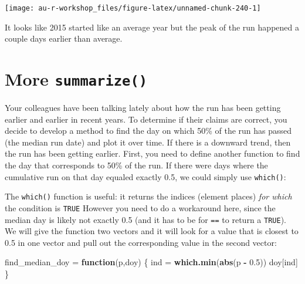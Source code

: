 \documentclass[]{book}
\newenvironment{Shaded}{\begin{snugshade}}{\end{snugshade}}
\newcommand{\KeywordTok}[1]{\textcolor[rgb]{0.13,0.29,0.53}{\textbf{#1}}}
\newcommand{\FloatTok}[1]{\textcolor[rgb]{0.00,0.00,0.81}{#1}}
\newcommand{\StringTok}[1]{\textcolor[rgb]{0.31,0.60,0.02}{#1}}
\newcommand{\ControlFlowTok}[1]{\textcolor[rgb]{0.13,0.29,0.53}{\textbf{#1}}}
\newcommand{\OperatorTok}[1]{\textcolor[rgb]{0.81,0.36,0.00}{\textbf{#1}}}
\newcommand{\NormalTok}[1]{#1}
\theoremstyle{definition}
\theoremstyle{definition}
\theoremstyle{definition}
\theoremstyle{remark}
\begin{document}
\begin{center}\texttt{[image: au-r-workshop\_files/figure-latex/unnamed-chunk-240-1]} \end{center}

It looks like 2015 started like an average year but the peak of the run
happened a couple days earlier than average.

\section{\texorpdfstring{More
\texttt{summarize()}}{More summarize()}}\label{more-summarize}

Your colleagues have been talking lately about how the run has been
getting earlier and earlier in recent years. To determine if their
claims are correct, you decide to develop a method to find the day on
which 50\% of the run has passed (the median run date) and plot it over
time. If there is a downward trend, then the run has been getting
earlier. First, you need to define another function to find the day that
corresponds to 50\% of the run. If there were days where the cumulative
run on that day equaled exactly 0.5, we could simply use
\texttt{which()}:

\begin{Shaded}
\end{Shaded}

The \texttt{which()} function is useful: it returns the indices (element
places) \emph{for which} the condition is \texttt{TRUE} However you need
to do a workaround here, since the median day is likely not exactly 0.5
(and it has to be for \texttt{==} to return a \texttt{TRUE}). We will
give the function two vectors and it will look for a value that is
closest to 0.5 in one vector and pull out the corresponding value in the
second vector:

\begin{Shaded}
\begin{Highlighting}[]
\NormalTok{find_median_doy =}\StringTok{ }\ControlFlowTok{function}\NormalTok{(p,doy) \{}
\NormalTok{  ind =}\StringTok{ }\KeywordTok{which.min}\NormalTok{(}\KeywordTok{abs}\NormalTok{(p }\OperatorTok{-}\StringTok{ }\FloatTok{0.5}\NormalTok{))}
\NormalTok{  doy[ind]}
\NormalTok{\}}
\end{Highlighting}
\end{Shaded}
\end{document}
